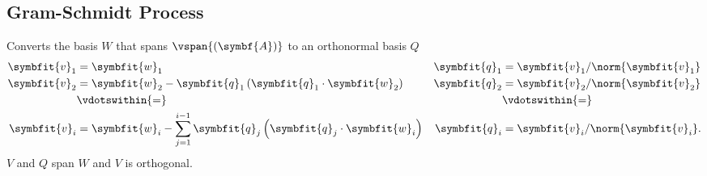 \documentclass{article}
\begin{document}
\begin{multicols*}{3}
    \subsection{Gram-Schmidt Process}
    Converts the basis \(W\) that spans \(\vspan{\left( \symbf{A} \right)}\) to an orthonormal basis \(Q\)
    \begin{align*}
        \symbfit{v}_1 & = \symbfit{w}_1                                                                                       & \symbfit{q}_1 & = \symbfit{v}_1/\norm{\symbfit{v}_1}  \\
        \symbfit{v}_2 & = \symbfit{w}_2 - \symbfit{q}_1 \left( \symbfit{q}_1 \cdot \symbfit{w}_2 \right)                      & \symbfit{q}_2 & = \symbfit{v}_2/\norm{\symbfit{v}_2}  \\
                      & \vdotswithin{=}                                                                                       &               & \vdotswithin{=}                       \\
        \symbfit{v}_i & = \symbfit{w}_i - \sum_{j = 1}^{i - 1} \symbfit{q}_j \left( \symbfit{q}_j \cdot \symbfit{w}_i \right) & \symbfit{q}_i & = \symbfit{v}_i/\norm{\symbfit{v}_i}.
    \end{align*}
    \(V\) and \(Q\) span \(W\) and \(V\) is orthogonal.

\end{multicols*}
\end{document}

